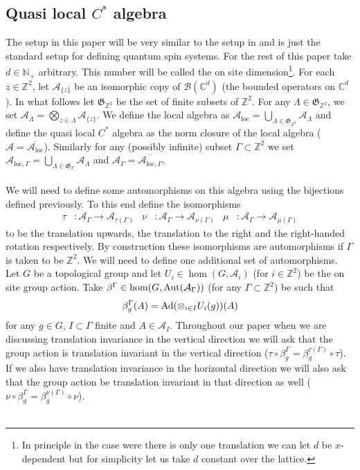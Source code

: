 \documentclass[12pt,a4paper,twoside]{article}
\let\originalleft\left
\let\originalright\right
\renewcommand{\left}{\mathopen{}\mathclose\bgroup\originalleft}
\renewcommand{\right}{\aftergroup\egroup\originalright}
\newcommand{\BB}{\mathcal B}
\newcommand{\ZZ}{\mathbb Z}
\newcommand{\CC}{\mathbb C}
\renewcommand{\AA}{\mathcal A}
\newcommand{\NN}{\mathbb{N}}
\newcommand{\Ad}[1]{\textrm{Ad}\left(#1\right)}
\newcommand{\Aut}[1]{\textrm{Aut}\left(#1\right)}
\theoremstyle{definition}
\numberwithin{equation}{section}
\begin{document}
\subsection{Quasi local $C^*$ algebra}\label{sec:QuasiLocalC*Algebra}
The setup in this paper will be very similar to the setup in \cite{ogata2021h3gmathbb} and is just the standard setup for defining quantum spin systems. For the rest of this paper take $d\in\NN_+$ arbitrary. This number will be called the on site dimension\footnote{In principle in the case were there is only one translation we can let $d$ be $x$-dependent but for simplicity let us take $d$ constant over the lattice.}. For each $z\in\ZZ^2$, let $\AA_{\{z\}}$ be an isomorphic copy of $\BB(\CC^d)$ (the bounded operators on $\CC^d$). In what follows let $\mathfrak{G}_{\ZZ^2}$ be the set of finite subsets of $\ZZ^2$. For any $\Lambda\in\mathfrak{G}_{\ZZ^2}$, we set $\AA_\Lambda=\bigotimes_{z\in\Lambda}\AA_{\{z\}}$. We define the local algebra as $\AA_{\text{loc}}=\bigcup_{\Lambda\in \mathfrak{G}_{\ZZ^2}}\AA_{\Lambda}$ and define the quasi local $C^*$ algebra as the norm closure of the local algebra ($\AA=\overline{\AA_{\text{loc}}}$). Similarly for any (possibly infinite) subset $\Gamma\subset\ZZ^2$ we set $\AA_{\text{loc},\Gamma}=\bigcup_{\Lambda\in \mathfrak{G}_{\Gamma}}\AA_{\Lambda}$ and $\AA_\Gamma=\overline{\AA_{\text{loc},\Gamma}}$.\\\\
We will need to define some automorphisms on this algebra using the bijections defined previously. To this end define the isomorphisms
\begin{align}
	\tau&:\AA_\Gamma\rightarrow\AA_{\tau(\Gamma)}&\nu&:\AA_\Gamma\rightarrow\AA_{\nu(\Gamma)}&\mu&:\AA_\Gamma\rightarrow\AA_{\mu(\Gamma)}
\end{align}
to be the translation upwards, the translation to the right and the right-handed rotation respectively. By construction these isomorphisms are automorphisms if $\Gamma$ is taken to be $\ZZ^2$. We will need to define one additional set of automorphisms. Let $G$ be a topological group and let $U_i\in\hom(G,\AA_i)$ (for $i\in\ZZ^2$) be the on site group action. Take $\beta^\Gamma\in\hom(G,\Aut{\AA_\Gamma})$ (for any $\Gamma\subset\ZZ^2$) be such that
\begin{equation}
	\beta^\Gamma_g(A)=\Ad{\otimes_{i\in I} U_i(g)}(A)
\end{equation}
for any $g\in G$, $I\subset\Gamma$ finite and $A\in\AA_I$. Throughout our paper when we are discussing translation invariance in the vertical direction we will ask that the group action is translation invariant in the vertical direction ($\tau\circ\beta_g^\Gamma=\beta_g^{\tau(\Gamma)}\circ\tau$). If we also have translation invariance in the horizontal direction we will also ask that the group action be translation invariant in that direction as well ($\nu\circ\beta_g^\Gamma=\beta_g^{\nu(\Gamma)}\circ\nu$).\\\\
\end{document}
